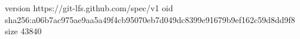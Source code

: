 version https://git-lfs.github.com/spec/v1
oid sha256:a06b7ac975ae9aa5a49f4cb95070eb7d049dc8399e91679b9ef162c59d8dd9f8
size 43840
